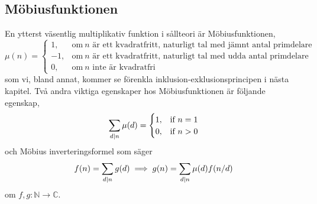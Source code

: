 \subsection{Möbiusfunktionen} \label{Mobius}
En ytterst väsentlig multiplikativ funktion i sållteori är Möbiusfunktionen,
\begin{equation*}
    \mu(n) = 
    \begin{cases}
        1, & \text{om}\ n \text{ är ett kvadratfritt, naturligt tal med jämnt antal primdelare}\\
        -1, & \text{om}\ n \text{ är ett kvadratfritt, naturligt tal med udda antal primdelare}\\
        0, & \text{om}\ n \text{ inte är kvadratfri}
    \end{cases}
\end{equation*}
som vi, bland annat, kommer se förenkla inklusion-exklusionsprincipen i nästa kapitel. Två andra viktiga egenskaper hos Möbiusfunktionen är följande egenskap,
\begin{equation*}
    \sum_{d \mid n} \mu(d) =
    \begin{cases}
        1, & \text{if}\ n = 1 \\
        0, & \text{if}\ n > 0
    \end{cases}
\end{equation*}
och Möbius inverteringsformel som säger
\begin{equation} \label{mobiusinv}
    f(n) = \sum_{d \mid n} g(d) \implies g(n) = \sum_{d \mid n} \mu(d) f(n/d)
\end{equation}
om \(f, g : \mathbb{N} \to \mathbb{C}\).



